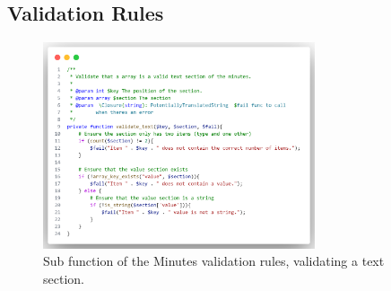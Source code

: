 \documentclass{UoYCSproject}
\begin{document}
\subsection{Validation Rules}

\begin{figure}[htb]
\begin{center}
\includegraphics[width=0.715\textwidth]{"./assets/apendix/rules-code-screenshots/Minutes - Text.png"}
\end{center}
\caption{Sub function of the Minutes validation rules, validating a text section.}
\end{figure}
\end{document}
